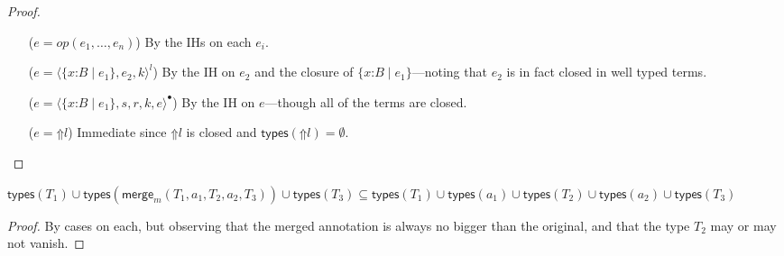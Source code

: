 \documentclass[9pt]{extarticle}
\newcommand{\ottnt}[1]{\mathit{#1}}
\newcommand{\ottmv}[1]{\mathit{#1}}
\newcommand{\ottsym}[1]{#1}
\begin{document}
\begin{lemma}
\begin{proof}
{\begin{itemize}
    \item[($\ottnt{e}  \ottsym{=}  \ottnt{op}  \ottsym{(}  \ottnt{e_{{\mathrm{1}}}}  \ottsym{,}  \dots  \ottsym{,}  \ottnt{e_{\ottmv{n}}}  \ottsym{)}$)] By the IHs on each $\ottnt{e_{\ottmv{i}}}$.
    \item[($\ottnt{e}  \ottsym{=}   \langle   \{ \mathit{x} \mathord{:} \ottnt{B} \mathrel{\mid} \ottnt{e_{{\mathrm{1}}}} \}  ,  \ottnt{e_{{\mathrm{2}}}} ,  \ottnt{k}  \rangle^{ \ottnt{l} } $)] By the IH on $\ottnt{e_{{\mathrm{2}}}}$ and the
      closure of $ \{ \mathit{x} \mathord{:} \ottnt{B} \mathrel{\mid} \ottnt{e_{{\mathrm{1}}}} \} $---noting that $\ottnt{e_{{\mathrm{2}}}}$ is in fact
      closed in well typed terms.
    \item[($\ottnt{e}  \ottsym{=}   \langle   \{ \mathit{x} \mathord{:} \ottnt{B} \mathrel{\mid} \ottnt{e_{{\mathrm{1}}}} \}  ,  \ottnt{s} ,  \ottnt{r} ,  \ottnt{k} ,  \ottnt{e}  \rangle^{\bullet} $)] By the IH on
      $\ottnt{e}$---though all of the terms are closed.
    \item[($\ottnt{e}  \ottsym{=}   \mathord{\Uparrow}  \ottnt{l} $)] Immediate since $ \mathord{\Uparrow}  \ottnt{l} $ is
      closed and $ \mathsf{types} (  \mathord{\Uparrow}  \ottnt{l}  )  =  \emptyset $.
    \end{itemize}
    \fi}
  \end{proof}
\end{lemma}

{\iffull
\begin{lemma}
  \label{lem:typesmerge}
  $    \mathsf{types} ( \ottnt{T_{{\mathrm{1}}}} )   \cup   \mathsf{types} (  \mathsf{merge} _{ \ottnt{m} }( \ottnt{T_{{\mathrm{1}}}} , \ottnt{a_{{\mathrm{1}}}} , \ottnt{T_{{\mathrm{2}}}} , \ottnt{a_{{\mathrm{2}}}} , \ottnt{T_{{\mathrm{3}}}} )  )    \cup   \mathsf{types} ( \ottnt{T_{{\mathrm{3}}}} )    \subseteq       \mathsf{types} ( \ottnt{T_{{\mathrm{1}}}} )   \cup   \mathsf{types} ( \ottnt{a_{{\mathrm{1}}}} )    \cup   \mathsf{types} ( \ottnt{T_{{\mathrm{2}}}} )    \cup   \mathsf{types} ( \ottnt{a_{{\mathrm{2}}}} )    \cup   \mathsf{types} ( \ottnt{T_{{\mathrm{3}}}} )   $
\begin{proof}
    By cases on each, but observing that the merged annotation is
    always no bigger than the original, and that the type $\ottnt{T_{{\mathrm{2}}}}$
    may or may not vanish.
  \end{proof}
\end{lemma}
\fi}
\end{document}
